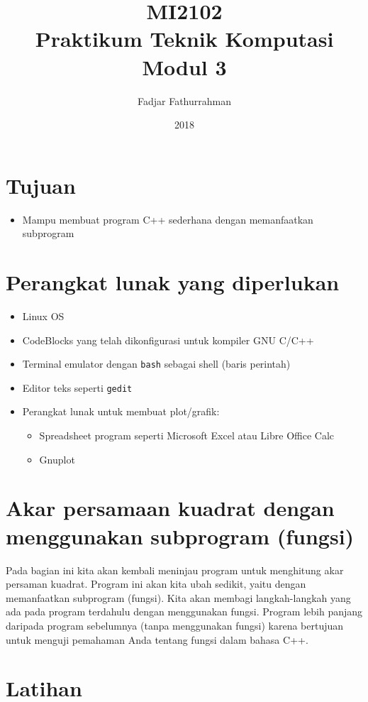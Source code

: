 \documentclass[a4paper,11pt]{extarticle}
\title{
MI2102\\
Praktikum Teknik Komputasi\\
Modul 3}
\author{Fadjar Fathurrahman}
\date{2018}
\begin{document}
\maketitle

\section{Tujuan}
\begin{itemize}
\item Mampu membuat program C++ sederhana dengan memanfaatkan subprogram
\end{itemize}

\section{Perangkat lunak yang diperlukan}
\begin{itemize}
\item Linux OS
\item CodeBlocks yang telah dikonfigurasi untuk kompiler GNU C/C++
\item Terminal emulator dengan \texttt{bash} sebagai shell (baris perintah)
\item Editor teks seperti \texttt{gedit}
\item Perangkat lunak untuk membuat plot/grafik:
\begin{itemize}
\item Spreadsheet program seperti \textsf{Microsoft Excel} atau \textsf{Libre Office Calc}
\item \textsf{Gnuplot}
\end{itemize}
\end{itemize}

\section{Akar persamaan kuadrat dengan menggunakan subprogram (fungsi)}
Pada bagian ini kita akan kembali meninjau program untuk menghitung akar
persaman kuadrat. Program ini akan kita ubah sedikit, yaitu dengan memanfaatkan
subprogram (fungsi). Kita akan membagi langkah-langkah yang ada pada
program terdahulu dengan menggunakan fungsi.
Program lebih panjang daripada program sebelumnya (tanpa menggunakan fungsi)
karena bertujuan untuk menguji pemahaman Anda tentang fungsi dalam bahasa C++.



\section{Latihan}
\end{document}
